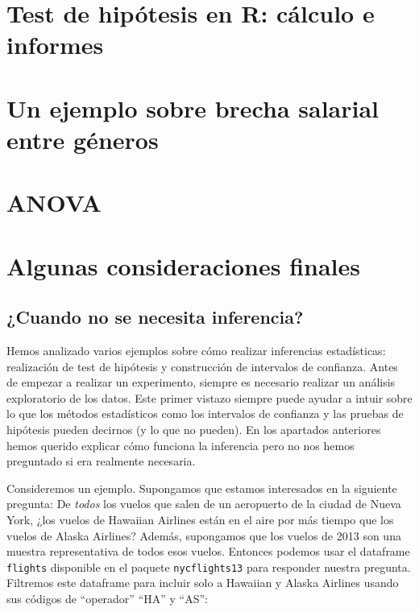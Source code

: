 \documentclass[
]{book}
\begin{document}
\hypertarget{test-de-hipuxf3tesis-en-r-cuxe1lculo-e-informes}{%
\section{Test de hipótesis en R: cálculo e informes}\label{test-de-hipuxf3tesis-en-r-cuxe1lculo-e-informes}}

\hypertarget{un-ejemplo-sobre-brecha-salarial-entre-guxe9neros}{%
\section{Un ejemplo sobre brecha salarial entre géneros}\label{un-ejemplo-sobre-brecha-salarial-entre-guxe9neros}}

\hypertarget{anova}{%
\section{ANOVA}\label{anova}}

\hypertarget{algunas-consideraciones-finales}{%
\section{Algunas consideraciones finales}\label{algunas-consideraciones-finales}}

\hypertarget{cuando-no-se-necesita-inferencia}{%
\subsection{¿Cuando no se necesita inferencia?}\label{cuando-no-se-necesita-inferencia}}

Hemos analizado varios ejemplos sobre cómo realizar inferencias estadísticas: realización de test de hipótesis y construcción de intervalos de confianza. Antes de empezar a realizar un experimento, siempre es necesario realizar un análisis exploratorio de los datos. Este primer vistazo siempre puede ayudar a intuir sobre lo que los métodos estadísticos como los intervalos de confianza y las pruebas de hipótesis pueden decirnos (y lo que no pueden). En los apartados anteriores hemos querido explicar cómo funciona la inferencia pero no nos hemos preguntado si era realmente necesaria.

Consideremos un ejemplo. Supongamos que estamos interesados en la siguiente pregunta: De \emph{todos} los vuelos que salen de un aeropuerto de la ciudad de Nueva York, ¿los vuelos de Hawaiian Airlines están en el aire por más tiempo que los vuelos de Alaska Airlines? Además, supongamos que los vuelos de 2013 son una muestra representativa de todos esos vuelos. Entonces podemos usar el dataframe \texttt{flights} disponible en el paquete \texttt{nycflights13} para responder nuestra pregunta. Filtremos este dataframe para incluir solo a Hawaiian y Alaska Airlines usando sus códigos de ``operador'' ``HA'' y ``AS'':
\end{document}
